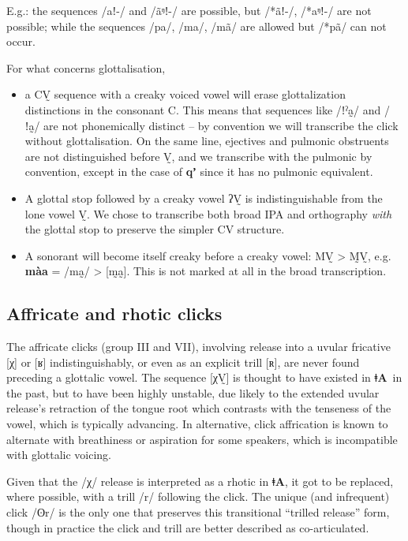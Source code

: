\documentclass[11pt,a5paper]{book}
\newcommand{\qcn}[1]{\textcolor{AccentText}{\large\textbf{#1}}}
\newcommand{\langname}{\qcn{ǂA}}
\begin{document}
E.g.: the sequences /aǃ-/ and /ãᵑǃ-/ are possible, but /*ãǃ-/, /*aᵑǃ-/ are not possible; while the sequences /pa/, /ma/, /mã/ are allowed but /*pã/ can not occur.

For what concerns glottalisation, 

\begin{itemize}
\item a CV̰ sequence with a creaky voiced vowel will erase glottalization distinctions in the consonant C. This means that sequences like /ǃˀa̰/ and /ǃa̰/ are not phonemically distinct -- by convention we will transcribe the click without glottalisation. On the same line, ejectives and pulmonic obstruents are not distinguished before V̰, and we transcribe with the pulmonic by convention, except in the case of \qcn{qʼ} since it has no pulmonic equivalent.
\item A glottal stop followed by a creaky vowel ʔV̰ is indistinguishable from the lone vowel V̰. We chose to transcribe both broad IPA and orthography \emph{with} the glottal stop to preserve the simpler CV structure.
\item A sonorant will become itself creaky before a creaky vowel: MV̰ > M̰V̰, e.g. \qcn{màa} = /ma̰/ > [m̰a̰]. This is not marked at all in the broad transcription.
\end{itemize}


\subsection{Affricate and rhotic clicks}\label{sec:rhoticclicks}

The affricate clicks (group III and VII), involving release into a uvular fricative [χ] or [ʁ] indistinguishably, or even as an explicit trill [ʀ], are never found preceding a glottalic vowel. The sequence [χV̰] is thought to have existed in \langname~in the past, but to have been highly unstable, due likely to the extended uvular release's retraction of the tongue root which contrasts with the tenseness of the vowel, which is typically advancing. In alternative, click affrication is known to alternate with breathiness or aspiration for some speakers, which is incompatible with glottalic voicing.

Given that the /χ/ release is interpreted as a rhotic in \langname, it got to be replaced, where possible, with a trill /r/ following the click. The unique (and infrequent) click /ʘr/ is the only one that preserves this transitional ``trilled release'' form, though in practice the click and trill are better described as co-articulated.
\end{document}
